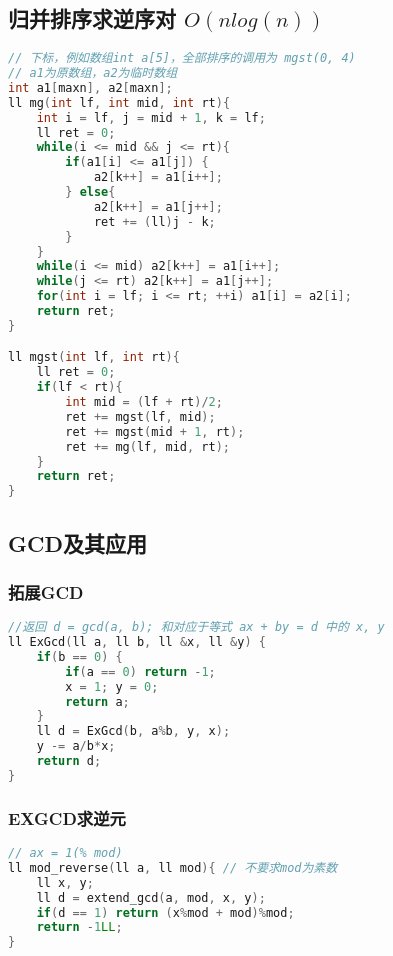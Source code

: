 \subsection{归并排序求逆序对 $O(nlog(n))$ }



\begin{lstlisting}[language=C++]
// 下标，例如数组int a[5]，全部排序的调用为 mgst(0, 4)
// a1为原数组，a2为临时数组
int a1[maxn], a2[maxn];
ll mg(int lf, int mid, int rt){
    int i = lf, j = mid + 1, k = lf;
    ll ret = 0;
    while(i <= mid && j <= rt){
        if(a1[i] <= a1[j]) {
            a2[k++] = a1[i++];
        } else{
            a2[k++] = a1[j++];
            ret += (ll)j - k;
        }
    }
    while(i <= mid) a2[k++] = a1[i++];
    while(j <= rt) a2[k++] = a1[j++];
    for(int i = lf; i <= rt; ++i) a1[i] = a2[i];
    return ret;
}

ll mgst(int lf, int rt){
    ll ret = 0;
    if(lf < rt){
        int mid = (lf + rt)/2;
        ret += mgst(lf, mid);
        ret += mgst(mid + 1, rt);
        ret += mg(lf, mid, rt);
    }
    return ret;
}        
\end{lstlisting}

\subsection{GCD及其应用}

\subsubsection{拓展GCD}

\begin{lstlisting}[language=C++]
//返回 d = gcd(a, b); 和对应于等式 ax + by = d 中的 x, y
ll ExGcd(ll a, ll b, ll &x, ll &y) {
    if(b == 0) {
        if(a == 0) return -1;
        x = 1; y = 0;
        return a;
    }
    ll d = ExGcd(b, a%b, y, x);
    y -= a/b*x;
    return d;
}
\end{lstlisting}

\subsubsection{EXGCD求逆元}

\begin{lstlisting}[language=C++]
// ax = 1(% mod)
ll mod_reverse(ll a, ll mod){ // 不要求mod为素数
    ll x, y;
    ll d = extend_gcd(a, mod, x, y);
    if(d == 1) return (x%mod + mod)%mod;
    return -1LL;
}
\end{lstlisting}

